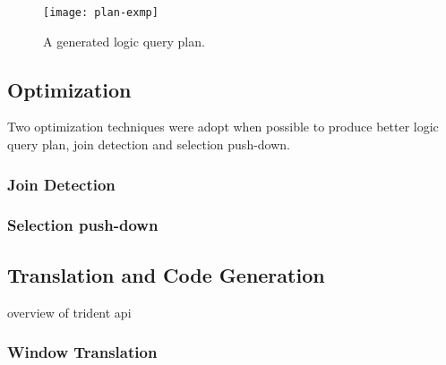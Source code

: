 \documentclass[conference, twocolumn, twoside, 11pt]{IEEEtran}
\theoremstyle{definition}
\begin{document}
\begin{figure}[hbt]
\centering
\texttt{[image: plan-exmp]}
\caption{A generated logic query plan.}
\label{plan-exmp}
\end{figure}

\subsection{Optimization}
Two optimization techniques were adopt when possible to produce better logic query plan, join detection and selection push-down.
\subsubsection{Join Detection}

\subsubsection{Selection push-down}


\subsection{Translation and Code Generation}
overview of trident api
\subsubsection{Window Translation}
\end{document}
